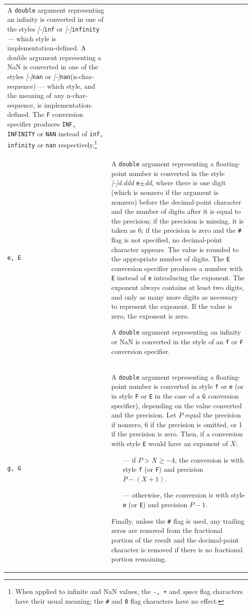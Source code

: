 \begin{longtable}{p{}p{}}
A \texttt{double} argument representing an infinity is converted in one of the styles
\textit{[-]}\texttt{inf} or \textit{[-]}\texttt{infinity} --- which style is
implementation-defined. A double argument representing a NaN is converted in
one of the styles \textit{[-]}\texttt{nan} or
\textit{[-]}\texttt{nan}(n-char-sequence) --- which style, and the meaning of
any n-char-sequence, is implementation-defined. The \texttt{F} conversion specifier 
produces \texttt{INF, INFINITY} or \texttt{NAN} instead of \texttt{inf,
  infinity} or \texttt{nan} respectively.\footnote{When applied to infinite and
  NaN values, the \texttt{-, +} and \textit{space} flag characters have their
  usual meaning; the \texttt{\#} and \texttt{0} flag characters have no
  effect.}\\
\texttt{e, E}&A \texttt{double} argument representing a floating-point number
is converted in the style \textit{[-]d.ddd} \texttt{e}$\pm$\textit{dd}, where
there is one digit (which is nonzero if the argument is nonzero) before the
decimal-point character and the number of digits after it is equal to the
precision; if the precision is missing, it is 
taken as 6; if the precision is zero and the \texttt{\#} flag is not specified,
no decimal-point character appears. The value is rounded to the appropriate
number of digits. The \texttt{E} conversion specifier produces a number with
\texttt{E} instead of \texttt{e} introducing the exponent. The exponent always
contains at least two digits, and only as many more digits as necessary to
represent the exponent. If the value is zero, the exponent is zero.

A \texttt{double} argument representing an infinity or NaN is converted in the
style of an \texttt{f} or \texttt{F} conversion specifier.\\
\texttt{g, G}&A \texttt{double} argument representing a floating-point number
is converted in style \texttt{f} or \texttt{e} (or in style \texttt{F} or
\texttt{E} in the case of a \texttt{G} conversion specifier), depending on the
value converted and the precision. Let $P$ equal the 
precision if nonzero, 6 if the precision is omitted, or 1 if the precision is zero.
Then, if a conversion with style \texttt{E} would have an exponent of
$X$:
\begin{itemize}
\item[---] if $P > X \ge - 4$, the conversion is with style \texttt{f} (or
  \texttt{F}) and precision $P - (X + 1)$.
\item[---] otherwise, the conversion is with style \texttt{e} (or \texttt{E})
  and precision $P - 1$.
\end{itemize}
Finally, unless the \texttt{\#} flag is used, any trailing zeros are removed from the
fractional portion of the result and the decimal-point character is removed if
there is no fractional portion remaining.


\end{longtable}
